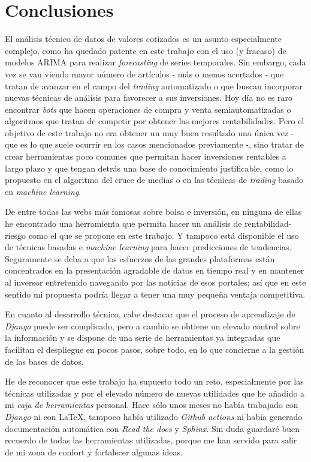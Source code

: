 
\section{Conclusiones}

El análisis técnico de datos de valores cotizados es un asunto especialmente complejo, como ha quedado patente en este trabajo con el uso (y fracaso) de modelos ARIMA para realizar \emph{forecasting} de series temporales. Sin embargo, cada vez se van viendo mayor número de artículos - más o menos acertados - que tratan de avanzar en el campo del \emph{trading} automatizado o que buscan incorporar nuevas técnicas de análisis para favorecer a sus inversiones. Hoy día no es raro encontrar \emph{bots} que hacen operaciones de compra y venta semiautomatizadas o algoritmos que tratan de competir por obtener las mejores rentabilidades. Pero el objetivo de este trabajo no era obtener un muy buen resultado una única vez - que es lo que suele ocurrir en los casos mencionados previamente -, sino tratar de crear herramientas poco comunes que permitan hacer inversiones rentables a largo plazo y que tengan detrás una base de conocimiento justificable, como lo propuesto en el algoritmo del cruce de medias o en las técnicas de \emph{trading} basado en \emph{machine learning}. 

De entre todas las webs más famosas sobre bolsa e inversión, en ninguna de ellas he encontrado una herramienta que permita hacer un análisis de rentabilidad-riesgo como el que se propone en este trabajo. Y tampoco está disponible el uso de técnicas basadas e \emph{machine learning} para hacer predicciones de tendencias. Seguramente se deba a que los esfuerzos de las grandes plataformas están concentrados en la presentación agradable de datos en tiempo real y en mantener al inversor entretenido navegando por las noticias de esos portales; así que en este sentido mi propuesta podría llegar a tener una muy pequeña ventaja competitiva. 

En cuanto al desarrollo técnico, cabe destacar que el proceso de aprendizaje de \emph{Django} puede ser complicado, pero a cambio se obtiene un elevado control sobre la información y se dispone de una serie de herramientas ya integradas que facilitan el despliegue en pocos pasos, sobre todo, en lo que concierne a la gestión de las bases de datos.

He de reconocer que este trabajo ha supuesto todo un reto, especialmente por las técnicas utilizadas y por el elevado número de nuevas utilidades que he añadido a mi \emph{caja de herramientas} personal. Hace sólo unos meses no había trabajado con \emph{Django} ni con \LaTeX , tampoco había utilizado \emph{Github actions} ni había generado documentación automática con \emph{Read the docs} y \emph{Sphinx}. Sin duda guardaré buen recuerdo de todas las herramientas utilizadas, porque me han servido para salir de mi zona de confort y fortalecer algunas ideas. 

